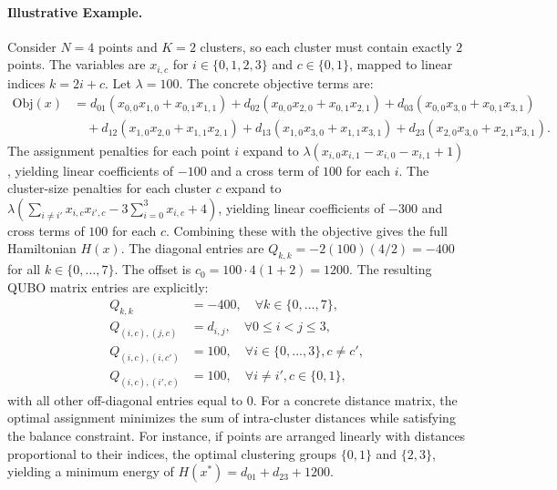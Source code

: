 \documentclass[12pt]{article}
\begin{document}
\paragraph{Illustrative Example.}
Consider $N=4$ points and $K=2$ clusters, so each cluster must contain exactly $2$ points. The variables are $x_{i,c}$ for $i \in \{0,1,2,3\}$ and $c \in \{0,1\}$, mapped to linear indices $k = 2i + c$. Let $\lambda = 100$. The concrete objective terms are:
\begin{align}
\text{Obj}(x) &= d_{01}(x_{0,0}x_{1,0} + x_{0,1}x_{1,1}) + d_{02}(x_{0,0}x_{2,0} + x_{0,1}x_{2,1}) + d_{03}(x_{0,0}x_{3,0} + x_{0,1}x_{3,1}) \\
&\quad + d_{12}(x_{1,0}x_{2,0} + x_{1,1}x_{2,1}) + d_{13}(x_{1,0}x_{3,0} + x_{1,1}x_{3,1}) + d_{23}(x_{2,0}x_{3,0} + x_{2,1}x_{3,1}).
\end{align}
The assignment penalties for each point $i$ expand to $\lambda \left( x_{i,0}x_{i,1} - x_{i,0} - x_{i,1} + 1 \right)$, yielding linear coefficients of $-100$ and a cross term of $100$ for each $i$. The cluster-size penalties for each cluster $c$ expand to $\lambda \left( \sum_{i \neq i'} x_{i,c}x_{i',c} - 3\sum_{i=0}^{3} x_{i,c} + 4 \right)$, yielding linear coefficients of $-300$ and cross terms of $100$ for each $c$. Combining these with the objective gives the full Hamiltonian $H(x)$. The diagonal entries are $Q_{k,k} = -2(100)(4/2) = -400$ for all $k \in \{0,\dots,7\}$. The offset is $c_0 = 100 \cdot 4 (1 + 2) = 1200$. The resulting QUBO matrix entries are explicitly:
\begin{align}
Q_{k,k} &= -400, \quad \forall k \in \{0,\dots,7\}, \\
Q_{(i,c),(j,c)} &= d_{i,j}, \quad \forall 0 \le i < j \le 3, \\
Q_{(i,c),(i,c')} &= 100, \quad \forall i \in \{0,\dots,3\}, c \neq c', \\
Q_{(i,c),(i',c)} &= 100, \quad \forall i \neq i', c \in \{0,1\},
\end{align}
with all other off-diagonal entries equal to $0$. For a concrete distance matrix, the optimal assignment minimizes the sum of intra-cluster distances while satisfying the balance constraint. For instance, if points are arranged linearly with distances proportional to their indices, the optimal clustering groups $\{0,1\}$ and $\{2,3\}$, yielding a minimum energy of $H(x^*) = d_{01} + d_{23} + 1200$.
\end{document}

